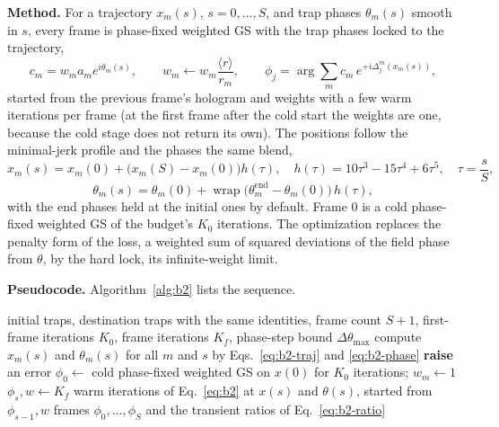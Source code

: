 \textbf{Method.} For a trajectory $x_m(s)$, $s=0,\dots,S$, and trap phases $\theta_m(s)$ smooth in $s$, every frame is phase-fixed weighted GS with the trap phases locked to the trajectory,
\begin{equation}
c_m=w_ma_me^{i\theta_m(s)},\qquad w_m\leftarrow w_m\frac{\langle r\rangle}{r_m},\qquad
\phi_j=\arg\sum_mc_m\,e^{+i\Delta_j^m(x_m(s))},
\label{eq:b2}
\end{equation}
started from the previous frame's hologram and weights with a few warm iterations per frame (at the first frame after the cold start the weights are one, because the cold stage does not return its own). The positions follow the minimal-jerk profile and the phases the same blend,
\begin{equation}
x_m(s)=x_m(0)+\big(x_m(S)-x_m(0)\big)h(\tau),\quad h(\tau)=10\tau^3-15\tau^4+6\tau^5,\quad \tau=\frac sS,
\label{eq:b2-traj}
\end{equation}
\begin{equation}
\theta_m(s)=\theta_m(0)+\operatorname{wrap}\big(\theta_m^{\mathrm{end}}-\theta_m(0)\big)\,h(\tau),
\label{eq:b2-phase}
\end{equation}
with the end phases held at the initial ones by default. Frame 0 is a cold phase-fixed weighted GS of the budget's $K_0$ iterations. The optimization replaces the penalty form of the loss, a weighted sum of squared deviations of the field phase from $\theta$, by the hard lock, its infinite-weight limit.

\textbf{Pseudocode.} Algorithm~\ref{alg:b2} lists the sequence.

\begin{algorithm}[t]
\caption{Flicker-bounded phase-continuous sequence. Each frame is a warm-started phase-fixed weighted GS whose trap phases are locked to the smooth trajectory of Eq.~\eqref{eq:b2-phase}.}
\label{alg:b2}
\begin{algorithmic}[1]
\Require initial traps, destination traps with the same identities, frame count $S+1$, first-frame iterations $K_0$, frame iterations $K_f$, phase-step bound $\Delta\theta_{\max}$
\State compute $x_m(s)$ and $\theta_m(s)$ for all $m$ and $s$ by Eqs.~\eqref{eq:b2-traj} and \eqref{eq:b2-phase}
 \State \textbf{raise} an error \EndIf
\State $\phi_0\gets$ cold phase-fixed weighted GS on $x(0)$ for $K_0$ iterations; $w_m\gets1$
  \State $\phi_s,w\gets K_f$ warm iterations of Eq.~\eqref{eq:b2} at $x(s)$ and $\theta(s)$, started from $\phi_{s-1},w$
\EndFor
\State \Return frames $\phi_0,\dots,\phi_S$ and the transient ratios of Eq.~\eqref{eq:b2-ratio}
\end{algorithmic}
\end{algorithm}

